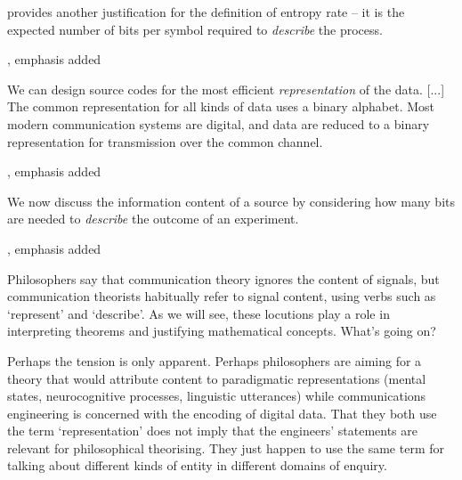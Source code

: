 \documentclass[12pt]{article}
\begin{document}
\begin{myquote}
 provides another justification for the definition of entropy rate -- it is the expected number of bits per symbol required to \textit{describe} the process.
\par\hspace*{\fill}\citet[115]{cover2006elements}, emphasis added
\end{myquote}

\begin{myquote}
We can design source codes for the most efficient \textit{representation} of the data. [...] The common representation for all kinds of data uses a binary alphabet. Most modern communication systems are digital, and data are reduced to a binary representation for transmission over the common channel.
\par\hspace*{\fill}\citet[218]{cover2006elements}, emphasis added
\end{myquote}

\begin{myquote}
We now discuss the information content of a source by considering how many bits are needed to \textit{describe} the outcome of an experiment.
\par\hspace*{\fill}\citet[73]{mackay2003information}, emphasis added
\end{myquote}

\noindent Philosophers say that communication theory ignores the content of signals, but communication theorists habitually refer to signal content, using verbs such as `represent' and `describe'.
As we will see, these locutions play a role in interpreting theorems and justifying mathematical concepts.
What's going on?

Perhaps the tension is only apparent.
Perhaps philosophers are aiming for a theory that would attribute content to paradigmatic representations (mental states, neurocognitive processes, linguistic utterances) while communications engineering is concerned with the encoding of digital data.
That they both use the term `representation' does not imply that the engineers' statements are relevant for philosophical theorising.
They just happen to use the same term for talking about different kinds of entity in different domains of enquiry.
\end{document}
